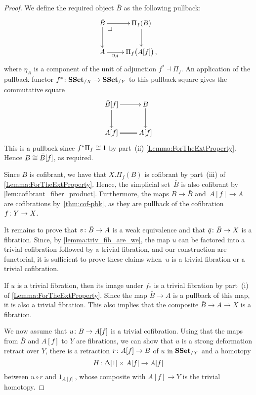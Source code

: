 \documentclass[reqno,10pt,a4paper,oneside,draft]{amsart}
\begin{document}
\begin{proof} We define the required object $\bar{B}$ as the following pullback:
\[\xymatrix{
\bar{B} \ar[d] \ar[r] \drpullback & \Pi_f(B) \ar[d] \\
A \ar[r]_-{\eta_{A}} & \Pi_f \big( A[f]  \big) \, ,
}\]
where $\eta_{A}$ is  a component of the unit of adjunction  $f^* \dashv \Pi_f$. An application of the pullback functor $f^* \colon \mathbf{SSet}_{/X} \to \mathbf{SSet}_{/Y}$ to this pullback square gives the commutative square
\[\xymatrix{
\bar{B}[f] \ar[d] \ar[r]  & B \ar[d] \\
A[f] \ar@{=}[r] &A[f] 
}\]
This is a pullback since $f^* \Pi_f \cong 1$ by part~(ii) \cref{Lemma:ForTheExtProperty}. Hence 
$B \cong \bar{B}[f]$, as required.


Since $B$ is cofibrant, we have that $X.\Pi_f(B)$ is cofibrant by part~(iii) of  \cref{Lemma:ForTheExtProperty}. Hence, the simplicial set~$\bar{B}$  is also cofibrant by \cref{lem:cofibrant_fiber_product}. Furthermore, the maps $B \rightarrow \bar{B}$ and~$A[f] \rightarrow A$ are cofibrations by~\cref{thm:cof-pbk}, as they are pullback of the cofibration~$f \colon Y \rightarrow X$.





It remains to prove that $v \colon \bar{B} \rightarrow A$ is a weak equivalence and that 
$\bar{q} \colon \bar{B} \rightarrow X$ is a fibration. Since, by \cref{lemma:triv_fib_are_we}, the map $u$ can be factored into a trivial cofibration followed by a trivial fibration, and our construction are functorial, it is sufficient to prove these claims when~$u$ is a trivial fibration or a trivial cofibration.

If $u$ is a trivial fibration, then its image under $f_*$ is a trivial fibration by 
part~(i) of \cref{Lemma:ForTheExtProperty}. Since the map $\bar{B} \rightarrow A$ is a pullback of this map,
it is also a trivial fibration. This also implies that the composite $\bar{B} \rightarrow A \rightarrow X$ is a fibration.


We now assume that $u \colon B \rightarrow A[f]$ is a trivial cofibration. Using that the maps from $\bar{B}$ and $A[f]$ to $Y$ are fibrations, we can show that $u$ is a strong deformation retract over $Y$, \ie there is a retraction $r \colon A[f] \rightarrow B$ of $u$ in $\mathbf{SSet}_{/Y}$ and a homotopy 
\[
H \colon \Delta[1] \times A[f] \rightarrow A[f]
\] 
between 
$u \circ r$ and $1_{A[f]}$, whose composite with $A[f] \rightarrow Y$ is the trivial homotopy.


\end{proof}
\end{document}
